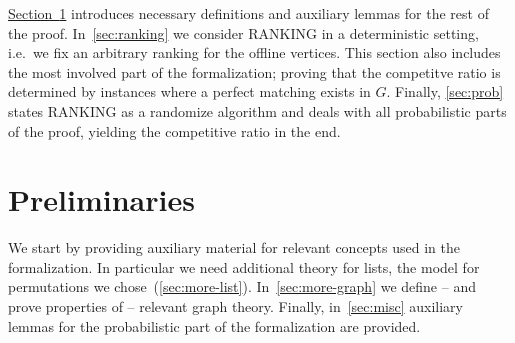\documentclass[11pt,a4paper]{article}
\begin{document}
\hyperref[sec:prelims]{Section~\ref*{sec:prelims}} introduces necessary definitions and auxiliary lemmas for the rest of the
proof. In~\autoref{sec:ranking} we consider RANKING in a deterministic setting, i.e.\ we fix
an arbitrary ranking for the offline vertices. This section also includes the most involved part
of the formalization; proving that the competitve ratio is determined by instances where a perfect
matching exists in $G$. Finally, \autoref{sec:prob} states RANKING as a randomize algorithm and
deals with all probabilistic parts of the proof, yielding the competitive ratio in the end.

\section{Preliminaries}\label{sec:prelims}
We start by providing auxiliary material for relevant concepts used in the formalization.
In particular we need additional theory for lists, the model for permutations we 
chose~(\autoref{sec:more-list}).
In~\autoref{sec:more-graph} we define -- and prove properties of -- relevant graph theory.
Finally, in~\autoref{sec:misc} auxiliary lemmas for the probabilistic part of the formalization
are provided.





\end{document}
